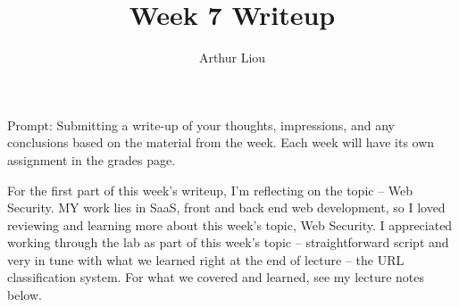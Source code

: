 \documentclass[12pt]{article}
\begin{document}
 
 
\title{Week 7 Writeup}
\author{Arthur Liou}

\maketitle

Prompt: Submitting a write-up of your thoughts, impressions, and any conclusions based on the material from the week. Each week will have its own assignment in the grades page.
\par

\linebreak
For the first part of this week’s writeup, I’m reflecting on the topic – Web Security. MY work lies in SaaS, front and back end web development, so I loved reviewing and learning more about this week’s topic, Web Security. I appreciated working through the lab as part of this week’s topic – straightforward script and very in tune with what we learned right at the end of lecture – the URL classification system.
For what we covered and learned, see my lecture notes below.
\end{document}
